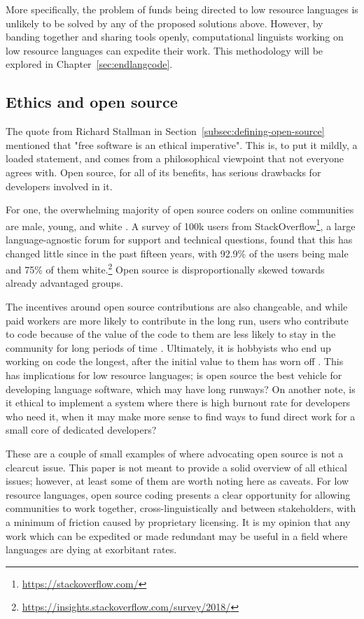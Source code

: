 More specifically, the problem of funds being directed to low resource languages is unlikely to be solved by any of the proposed solutions above. However, by banding together and sharing tools openly, computational linguists working on low resource languages can expedite their work. This methodology will be explored in Chapter~\ref{sec:endlangcode}.

\subsection{Ethics and open source}
\label{subsec:oss-ethics}

The quote from Richard Stallman in Section~\ref{subsec:defining-open-source} mentioned that "free software is an ethical imperative". This is, to put it mildly, a loaded statement, and comes from a philosophical viewpoint that not everyone agrees with. Open source, for all of its benefits, has serious drawbacks for developers involved in it.

For one, the overwhelming majority of open source coders on online communities are male, young, and white \citep{ghosh2002free}. A survey of 100k users from StackOverflow\footnote{\href{https://stackoverflow.com/}{https://stackoverflow.com/}}, a large language-agnostic forum for support and technical questions, found that this has changed little since in the past fifteen years, with 92.9\% of the users being male and 75\% of them white.\footnote{\href{https://insights.stackoverflow.com/survey/2018/}{https://insights.stackoverflow.com/survey/2018/}} Open source is disproportionally skewed towards already advantaged groups.

The incentives around open source contributions are also changeable, and while paid workers are more likely to contribute in the long run, users who contribute to code because of the value of the code to them are less likely to stay in the community for long periods of time \citep{roberts2006understanding, shah2006motivation}. Ultimately, it is hobbyists who end up working on code the longest, after the initial value to them has worn off \citep{shah2006motivation}. This has implications for low resource languages; is open source the best vehicle for developing language software, which may have long runways? On another note, is it ethical to implement a system where there is high burnout rate for developers who need it, when it may make more sense to find ways to fund direct work for a small core of dedicated developers? 

These are a couple of small examples of where advocating open source is not a clearcut issue. This paper is not meant to provide a solid overview of all ethical issues; however, at least some of them are worth noting here as caveats. For low resource languages, open source coding presents a clear opportunity for allowing communities to work together, cross-linguistically and between stakeholders, with a minimum of friction caused by proprietary licensing. It is my opinion that any work which can be expedited or made redundant may be useful in a field where languages are dying at exorbitant rates. 

